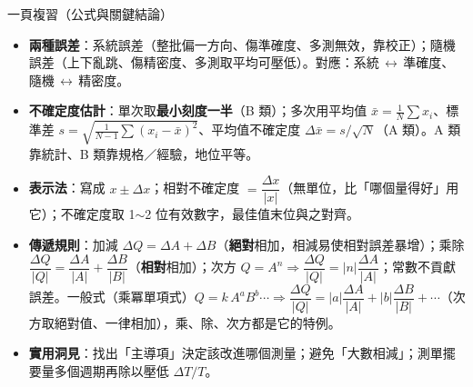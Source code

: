 \documentclass[11pt]{article}
\begin{document}
\begin{補充框}{一頁複習（公式與關鍵結論）}
\begin{itemize}\setlength{\itemsep}{2pt}
\item \textbf{兩種誤差}：系統誤差（整批偏一方向、傷準確度、多測無效，靠校正）；隨機誤差（上下亂跳、傷精密度、多測取平均可壓低）。對應：系統\,$\leftrightarrow$\,準確度、隨機\,$\leftrightarrow$\,精密度。
\item \textbf{不確定度估計}：單次取\textbf{最小刻度一半}（B 類）；多次用平均值 $\bar{x}=\frac{1}{N}\sum x_i$、標準差 $s=\sqrt{\frac{1}{N-1}\sum(x_i-\bar{x})^2}$、平均值不確定度 $\Delta\bar{x}=s/\sqrt{N}$（A 類）。A 類靠統計、B 類靠規格／經驗，地位平等。
\item \textbf{表示法}：寫成 $x\pm\Delta x$；相對不確定度 $=\dfrac{\Delta x}{|x|}$（無單位，比「哪個量得好」用它）；不確定度取 1$\sim$2 位有效數字，最佳值末位與之對齊。
\item \textbf{傳遞規則}：加減 $\Delta Q=\Delta A+\Delta B$（\textbf{絕對}相加，相減易使相對誤差暴增）；乘除 $\dfrac{\Delta Q}{|Q|}=\dfrac{\Delta A}{|A|}+\dfrac{\Delta B}{|B|}$（\textbf{相對}相加）；次方 $Q=A^n\Rightarrow\dfrac{\Delta Q}{|Q|}=|n|\dfrac{\Delta A}{|A|}$；常數不貢獻誤差。一般式（乘冪單項式）$Q=k\,A^a B^b\cdots\Rightarrow\dfrac{\Delta Q}{|Q|}=|a|\dfrac{\Delta A}{|A|}+|b|\dfrac{\Delta B}{|B|}+\cdots$（次方取絕對值、一律相加），乘、除、次方都是它的特例。
\item \textbf{實用洞見}：找出「主導項」決定該改進哪個測量；避免「大數相減」；測單擺要量多個週期再除以壓低 $\Delta T/T$。
\end{itemize}
\end{補充框}
\end{document}
